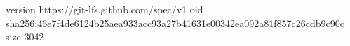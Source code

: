 version https://git-lfs.github.com/spec/v1
oid sha256:46e7f4de6124b25aea933acc93a27b41631e00342ea092a81f857c26cdb9c90c
size 3042
